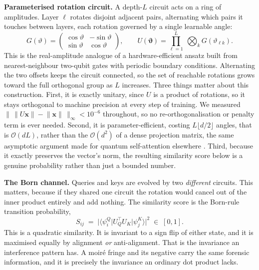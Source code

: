 \documentclass[conference]{IEEEtran}
\newcommand{\bs}[1]{\boldsymbol{#1}}
\newcommand{\ket}[1]{\lvert #1 \rangle}
\newcommand{\bra}[1]{\langle #1 \rvert}
\begin{document}
\textbf{Parameterised rotation circuit.} A depth-$L$ circuit acts on a ring of
amplitudes. Layer $\ell$ rotates disjoint adjacent pairs, alternating which pairs it
touches between layers, each rotation governed by a single learnable angle:
\begin{equation}
G(\vartheta)=\begin{pmatrix}\cos\vartheta & -\sin\vartheta\\
\sin\vartheta & \cos\vartheta\end{pmatrix},
\qquad
U(\bs{\vartheta})=\prod_{\ell=1}^{L}\ \bigotimes_{k} G(\vartheta_{\ell k}).
\label{eq:givens}
\end{equation}
This is the real-amplitude analogue of a hardware-efficient ansatz built from
nearest-neighbour two-qubit gates with periodic boundary conditions. Alternating the
two offsets keeps the circuit connected, so the set of reachable rotations grows
toward the full orthogonal group as $L$ increases. Three things matter about this
construction. First, it is exactly unitary, since $U$ is a product of rotations, so
it stays orthogonal to machine precision at every step of training. We measured
$\lVert\,\lVert U\bs{x}\rVert - \lVert\bs{x}\rVert\,\rVert_{\infty} < 10^{-6}$
throughout, so no re-orthogonalisation or penalty term is ever needed. Second, it is
parameter-efficient, costing $L\lfloor d/2\rfloor$ angles, that is
$\mathcal{O}(dL)$, rather than the $\mathcal{O}(d^{2})$ of a dense projection
matrix, the same asymptotic argument made for quantum self-attention elsewhere
\cite{cherrat2024qvt,evans2025on}. Third, because it exactly preserves the vector's
norm, the resulting similarity score below is a genuine probability rather than just
a bounded number.

\textbf{The Born channel.} Queries and keys are evolved by two \emph{different}
circuits. This matters, because if they shared one circuit the rotation would cancel
out of the inner product entirely and add nothing. The similarity score is the
Born-rule transition probability,
\begin{equation}
S_{ij} \;=\; \bigl\lvert \bra{\psi^{Q}_{i}} U_{Q}^{\!\top} U_{K} \ket{\psi^{K}_{j}} \bigr\rvert^{2}
\;\in\;[0,1].
\label{eq:born}
\end{equation}
This is a quadratic similarity. It is invariant to a sign flip of either state, and
it is maximised equally by alignment \emph{or} anti-alignment. That is the
invariance an interference pattern has. A moir\'e fringe and its negative carry the
same forensic information, and it is precisely the invariance an ordinary dot
product lacks.
\end{document}
